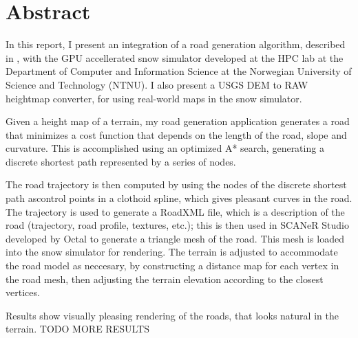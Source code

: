 \chapter*{Abstract}

In this report, I present an integration of a road generation algorithm, described in \cite{roadgen}, with the GPU accellerated snow simulator developed at the HPC lab at the Department of Computer and Information Science at the Norwegian University of Science and Technology (NTNU). I also present a USGS DEM to RAW heightmap converter, for using real-world maps in the snow simulator. 

Given a height map of a terrain, my road generation application generates a road that minimizes a cost function that depends on the length of the road, slope and curvature. This is accomplished using an optimized A* search, generating a discrete shortest path represented by a series of nodes. 

The road trajectory is then computed by using the nodes of the discrete shortest path ascontrol points in a clothoid spline, which gives pleasant curves in the road. The trajectory is used to generate a RoadXML file, which is a description of the road (trajectory, road profile, textures, etc.); this is then used in SCANeR Studio developed by Octal\cite{octalstudio} to generate a triangle mesh of the road. This mesh is loaded into the snow simulator for rendering. The terrain is adjusted to accommodate the road model as neccesary, by constructing a distance map for each vertex in the road mesh, then adjusting the terrain elevation according to the closest vertices.

Results show visually pleasing rendering of the roads, that looks natural in the terrain. TODO MORE RESULTS

